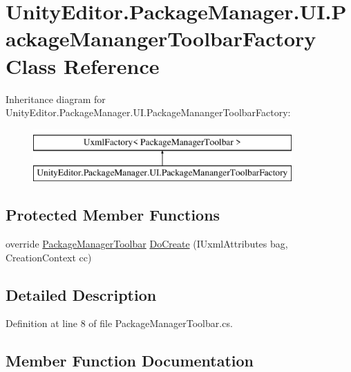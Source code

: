 \hypertarget{class_unity_editor_1_1_package_manager_1_1_u_i_1_1_package_mananger_toolbar_factory}{}\section{Unity\+Editor.\+Package\+Manager.\+U\+I.\+Package\+Mananger\+Toolbar\+Factory Class Reference}
\label{class_unity_editor_1_1_package_manager_1_1_u_i_1_1_package_mananger_toolbar_factory}
Inheritance diagram for Unity\+Editor.\+Package\+Manager.\+U\+I.\+Package\+Mananger\+Toolbar\+Factory\+:\begin{figure}[H]
\begin{center}
\leavevmode
\includegraphics[height=2.000000cm]{class_unity_editor_1_1_package_manager_1_1_u_i_1_1_package_mananger_toolbar_factory}
\end{center}
\end{figure}
\subsection*{Protected Member Functions}
\begin{DoxyCompactItemize}
\item 
override \mbox{\hyperlink{class_unity_editor_1_1_package_manager_1_1_u_i_1_1_package_manager_toolbar}{Package\+Manager\+Toolbar}} \mbox{\hyperlink{class_unity_editor_1_1_package_manager_1_1_u_i_1_1_package_mananger_toolbar_factory_a46df105f8bd31b6e61e339769e2297e8}{Do\+Create}} (I\+Uxml\+Attributes bag, Creation\+Context cc)
\end{DoxyCompactItemize}


\subsection{Detailed Description}


Definition at line 8 of file Package\+Manager\+Toolbar.\+cs.



\subsection{Member Function Documentation}
\mbox{\label{class_unity_editor_1_1_package_manager_1_1_u_i_1_1_package_mananger_toolbar_factory_a46df105f8bd31b6e61e339769e2297e8}} 
